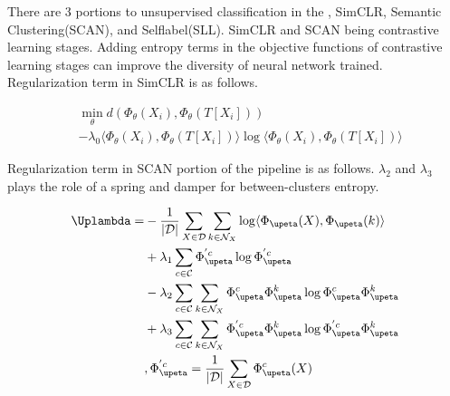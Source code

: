\documentclass[10pt,twocolumn,letterpaper]{article}
\begin{document}
There are 3 portions to unsupervised classification in the \cite{wvangansbeke2020scan}, SimCLR, Semantic Clustering(SCAN), and Selflabel(SLL). SimCLR and SCAN being contrastive learning stages. Adding entropy terms in the objective functions of contrastive learning stages can improve the diversity of neural network trained. Regularization term in SimCLR is as follows.

\begin{equation}
\begin{aligned}
& \min_{\theta}d(\Phi_{\theta}(X_i), \Phi_{\theta}(T[X_i])) \\
& - \lambda_{0} \langle \Phi_{\theta}(X_i), \Phi_{\theta}(T[X_i]) \rangle \log \langle \Phi_{\theta}(X_i), \Phi_{\theta}(T[X_i]) \rangle
\end{aligned}
\end{equation}

Regularization term in SCAN portion of the pipeline is as follows. $\lambda_{2}$ and $\lambda_{3}$ plays the role of a spring and damper for between-clusters entropy.

\begin{equation}
\begin{aligned}
\Uplambda =   & -\frac{1}{|\mathcal{D}|} \sum_{X \in \mathcal{D}} \sum_{k \in \mathcal{N}_X} \log \langle \Phi_{\upeta}(X), \Phi_{\upeta}(k) \rangle \\
& +  \lambda_{1} \sum_{c \in \mathcal{C}}  \Phi_{\upeta}^{'c} \log  \Phi_{\upeta}^{'c} \\
& - \lambda_{2} \sum_{c \in \mathcal{C}} \sum_{k \in \mathcal{N}_X} \Phi_{\upeta}^{c} \Phi_{\upeta}^{k} \log  \Phi_{\upeta}^{c}\Phi_{\upeta}^{k}  \\
& + \lambda_{3} \sum_{c \in \mathcal{C}}  \sum_{k \in \mathcal{N}_X} \Phi_{\upeta}^{'c} \Phi_{\upeta}^{k} \log  \Phi_{\upeta}^{'c} \Phi_{\upeta}^{k} \\
& , \space \Phi_{\upeta}^{'c} = \frac{1}{|\mathcal{D}|} \sum_{X \in \mathcal{D}}  \Phi_{\upeta}^{c} (X)
\end{aligned}
\end{equation}
\end{document}
